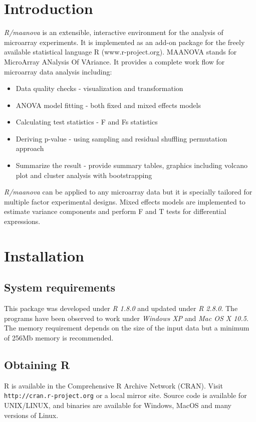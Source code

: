 \section{Introduction}
{\em R/maanova} is an extensible, 
interactive environment for the analysis of microarray experiments. 
It is implemented as an add-on
package for the freely available statistical language R (www.r-project.org).
MAANOVA stands for MicroArray ANalysis Of VAriance. It provides a complete 
work flow for microarray data analysis including:
\begin{itemize}
\item Data quality checks - visualization and transformation
\item ANOVA model fitting - both fixed and mixed effects models
\item Calculating test statistics - F and Fs statistics
\item Deriving p-value - using sampling and residual shuffling permutation approach
\item Summarize the result - provide summary tables, graphics including volcano plot and cluster analysis with bootstrapping
\end{itemize}

{\em R/maanova} can be applied to any microarray data but it is
specially tailored for multiple factor experimental designs.
Mixed effects models are implemented to estimate variance components 
and perform F and T tests for differential expressions.
\newpage
\section{Installation}
\subsection{System requirements}
This package was developed under {\em R 1.8.0} and updated under {\em R 2.8.0}. The programs have been 
observed to work under {\em Windows XP} and {\em Mac OS X 10.5}. The memory requirement
depends on the size of the input data but a minimum of 256Mb memory
is recommended. 
\subsection{Obtaining R}
R is available in the Comprehensive R Archive Network (CRAN).
Visit \\{\tt http://cran.r-project.org} or a local mirror site.
Source code is available for UNIX/LINUX, and binaries are 
available for Windows, MacOS and many versions of Linux.  
